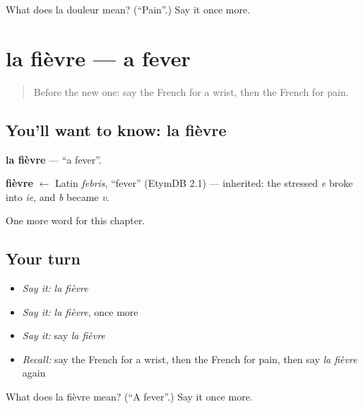 \begin{tcolorbox}[breakable,colback=teal!4,colframe=teal!35!black,title={Before you move on}]
What does la douleur mean? (\textquotedblleft{}Pain\textquotedblright{}.) Say it once more.
\end{tcolorbox}
\section[la fièvre]{la fièvre — a fever}

\label{lesson:FR-C53-fievre}



\begin{quote}
Before the new one: say the French for a wrist, then the French for pain.
\end{quote}

\subsection*{You'll want to know: la fièvre}
\textbf{la fièvre} — \textquotedblleft{}a fever\textquotedblright{}.

\begin{cousinweb}
\textbf{fièvre} $\leftarrow$ Latin \emph{febris}, \textquotedblleft{}fever\textquotedblright{} (EtymDB 2.1) — inherited: the stressed \emph{e} broke into \emph{ie}, and \emph{b} became \emph{v}.
\end{cousinweb}

\begin{grammarlens}[title={What you've built}]
One more word for this chapter.
\end{grammarlens}

\subsection*{Your turn}
\begin{itemize}
\raggedright
  \item \emph{Say it:} \emph{la fièvre}
  \item \emph{Say it:} \emph{la fièvre}, once more
  \item \emph{Say it:} say \emph{la fièvre}
  \item \emph{Recall:} say the French for a wrist, then the French for pain, then say \emph{la fièvre} again
\end{itemize}

\begin{tcolorbox}[breakable,colback=teal!4,colframe=teal!35!black,title={Before you move on}]
What does la fièvre mean? (\textquotedblleft{}A fever\textquotedblright{}.) Say it once more.
\end{tcolorbox}
